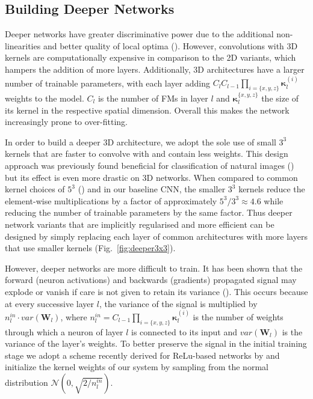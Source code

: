 \subsection{Building Deeper Networks}
\label{subsec:buildingADeeperNetwork}
Deeper networks have greater discriminative power due to the additional non-linearities and better quality of local optima (\cite{Choromanska2015}). However, convolutions with 3D kernels are computationally expensive in comparison to the 2D variants, which hampers the addition of more layers. Additionally, 3D architectures have a larger number of trainable parameters, with each layer adding $C_l C_{l-1} \prod_{i=\{x,y,z\}}{\boldsymbol{\kappa}_{l}^{(i)}}$ weights to the model. $C_l$ is the number of FMs in layer $l$ and $\boldsymbol{\kappa}_{l}^{\{x,y,z\}}$ the size of its kernel in the respective spatial dimension. Overall this makes the network increasingly prone to over-fitting.

In order to build a deeper 3D architecture, we adopt the sole use of small $3^3$ kernels that are faster to convolve with and contain less weights. This design approach was previously found beneficial for classification of natural images (\cite{Simonyan2014}) but its effect is even more drastic on 3D networks. When compared to common kernel choices of $5^3$ (\cite{zikic2014CnnBrats, urban2014CnnBrats, prasoon2013Knee}) and in our baseline CNN, the smaller $3^3$ kernels reduce the element-wise multiplications by a factor of approximately $5^3/3^3 \approx 4.6$ while reducing the number of trainable parameters by the same factor. Thus deeper network variants that are implicitly regularised and more efficient can be designed by simply replacing each layer of common architectures with more layers that use smaller kernels (Fig.~\ref{fig:deeper3x3}). 





However, deeper networks are more difficult to train. It has been shown that the forward (neuron activations) and backwards (gradients) propagated signal may explode or vanish if care is not given to retain its variance (\cite{Glorot2010}). This occurs because at every successive layer $l$, the variance of the signal is multiplied by $n^{in}_l \cdot var(\mathbf{W}_l)$, where $n^{in}_l=C_{l-1} \prod_{i=\{x,y,z\}}{\boldsymbol{\kappa}_{l}^{(i)}}$ is the number of weights through which a neuron of layer $l$ is connected to its input and $var(\mathbf{W}_l)$ is the variance of the layer's weights. To better preserve the signal in the initial training stage we adopt a scheme recently derived for ReLu-based networks by \cite{he2015delving} and initialize the kernel weights of our system by sampling from the normal distribution $\mathcal{N}(0,\sqrt{2/n^{in}_l})$.

